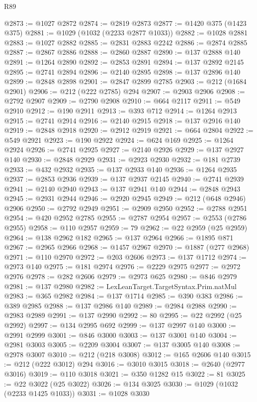 \begin{lexlean}{R89}
\begin{coremodule}
@2873 := @1027 @2872
@2874 := @2819 @2873
@2877 := @1420 @375 (@1423 @375)
@2881 := @1029 (@1032 (@2233 @2877 @1033))
@2882 := @1028 @2881
@2883 := @1027 @2882
@2885 := @2831 @2883 @2242
@2886 := @2874 @2885
@2887 := @2867 @2886
@2888 := @2860 @2887
@2890 := @137 @2888 @140
@2891 := @1264 @2890
@2892 := @2853 @2891
@2894 := @137 @2892 @2145
@2895 := @2741 @2894
@2896 := @2140 @2895
@2898 := @137 @2896 @140
@2899 := @2848 @2898
@2901 := @2847 @2899 @2785
@2903 := @212 (@1684 @2901)
@2906 := @212 (@222 @2785) @294
@2907 := @2903 @2906
@2908 := @2792 @2907
@2909 := @2790 @2908
@2910 := @664 @2117
@2911 := @549 @2910
@2912 := @190 @2911
@2913 := @393 @712
@2914 := @1264 @2913
@2915 := @2741 @2914
@2916 := @2140 @2915
@2918 := @137 @2916 @140
@2919 := @2848 @2918
@2920 := @2912 @2919
@2921 := @664 @2804
@2922 := @549 @2921
@2923 := @190 @2922
@2924 := @624 @169
@2925 := @1264 @2924
@2926 := @2741 @2925
@2927 := @2140 @2926
@2929 := @137 @2927 @140
@2930 := @2848 @2929
@2931 := @2923 @2930
@2932 := @181 @2739
@2933 := @432 @2932
@2935 := @137 @2933 @140
@2936 := @1264 @2935
@2937 := @2853 @2936
@2939 := @137 @2937 @2145
@2940 := @2741 @2939
@2941 := @2140 @2940
@2943 := @137 @2941 @140
@2944 := @2848 @2943
@2945 := @2931 @2944
@2946 := @2920 @2945
@2949 := @212 (@648 @2946) @2906
@2950 := @2792 @2949
@2951 := @2909 @2950
@2952 := @2788 @2951
@2954 := @420 @2952 @2785
@2955 := @2787 @2954
@2957 := @2553 (@2786 @2955)
@2958 := @110 @2957
@2959 := 79
@2962 := @22 @2959 (@25 @2959)
@2964 := @138 @2962 @182
@2965 := @137 @2964
@2966 := @1895 @871
@2967 := @2965 @2966
@2968 := @1457 @2967
@2970 := @1887 (@277 @2968)
@2971 := @110 @2970
@2972 := @203 @2606
@2973 := @137 @1712
@2974 := @2973 @140
@2975 := @181 @2974
@2976 := @2229 @2975
@2977 := @2972 @2976
@2978 := @282 @2606
@2979 := @2973 @625
@2980 := @846 @2979
@2981 := @137 @2980
@2982 := LexLeanTarget.TargetSyntax.Prim.natMul
@2983 := @365 @2982
@2984 := @137 @1714
@2985 := @390 @383
@2986 := @389 @2985
@2988 := @137 @2986 @140
@2989 := @2984 @2988
@2990 := @2983 @2989
@2991 := @137 @2990
@2992 := 80
@2995 := @22 @2992 (@25 @2992)
@2997 := @134 @2995 @692
@2999 := @137 @2997 @140
@3000 := @2991 @2999
@3001 := @846 @3000
@3003 := @137 @3001 @140
@3004 := @2981 @3003
@3005 := @2209 @3004
@3007 := @137 @3005 @140
@3008 := @2978 @3007
@3010 := @212 (@218 @3008)
@3012 := @165 @2606 @140
@3015 := @212 (@222 @3012) @294
@3016 := @3010 @3015
@3018 := @2640 (@2977 @3016)
@3019 := @110 @3018
@3021 := @350 @1282 @15
@3022 := 81
@3025 := @22 @3022 (@25 @3022)
@3026 := @134 @3025
@3030 := @1029 (@1032 (@2233 @1425 @1033))
@3031 := @1028 @3030

\end{coremodule}
\end{lexlean}
